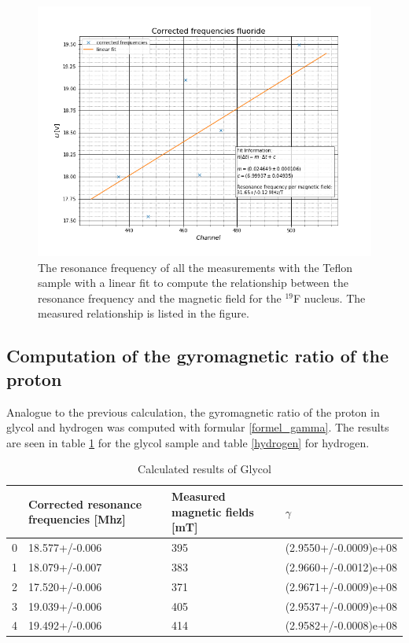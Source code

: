 \begin{figure}[h]
	\includegraphics[scale=0.5]{Bild/flouride}
	\centering
	\caption[Plot of the fluoride resonance frequencies per magnetic field strength]{The resonance frequency of all the measurements with the Teflon sample with a linear fit to compute the relationship between the resonance frequency and the magnetic field for the $^{19}$F nucleus. The measured relationship is listed in the figure.}
	\label{teflon_pic}
\end{figure}


\FloatBarrier
\subsection{Computation of the gyromagnetic ratio of the proton}

Analogue to the previous calculation, the gyromagnetic ratio of the proton in glycol and hydrogen was computed with formular \ref{formel_gamma}. The results are seen in table \ref{glycol} for the glycol sample and table \ref{hydrogen} for hydrogen. 
\begin{table}[h]
	\caption{Calculated results of Glycol}
	\label{glycol}
	\begin{tabular}{llll}
		\toprule
		{} & Corrected resonance frequencies [Mhz] & Measured magnetic fields [mT] &               $\gamma$ \\
		\midrule
		0 &                        18.577+/-0.006 &                           395 &  (2.9550+/-0.0009)e+08 \\
		1 &                        18.079+/-0.007 &                           383 &  (2.9660+/-0.0012)e+08 \\
		2 &                        17.520+/-0.006 &                           371 &  (2.9671+/-0.0009)e+08 \\
		3 &                        19.039+/-0.006 &                           405 &  (2.9537+/-0.0009)e+08 \\
		4 &                        19.492+/-0.006 &                           414 &  (2.9582+/-0.0008)e+08 \\
		\bottomrule
	\end{tabular}
\end{table}

